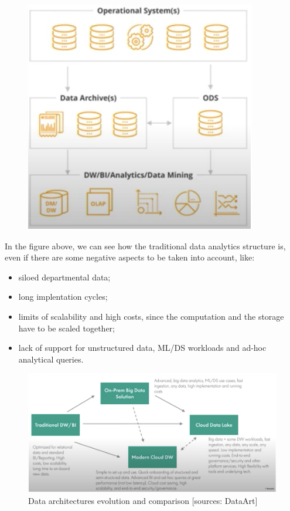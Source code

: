 \begin{figure}[ht!]
    \centering
    \includegraphics[scale=0.7]{images/traditional_data_analytics_architecture.png}
\end{figure}
In the figure above, we can see how the traditional data analytics structure is, even if there are some negative aspects to be taken into account, like:
\begin{itemize}
    \item siloed departmental data;
    \item long implentation cycles;
    \item limits of scalability and high costs, since the computation and the storage have to be scaled together;
    \item lack of support for unstructured data, ML/DS workloads and ad-hoc analytical queries.
\end{itemize}

\begin{figure}[ht!]
    \centering
    \includegraphics[scale=0.65]{images/data_architectures_evolution.png}
    \caption{Data architectures evolution and comparison [sources: DataArt]}
\end{figure}

